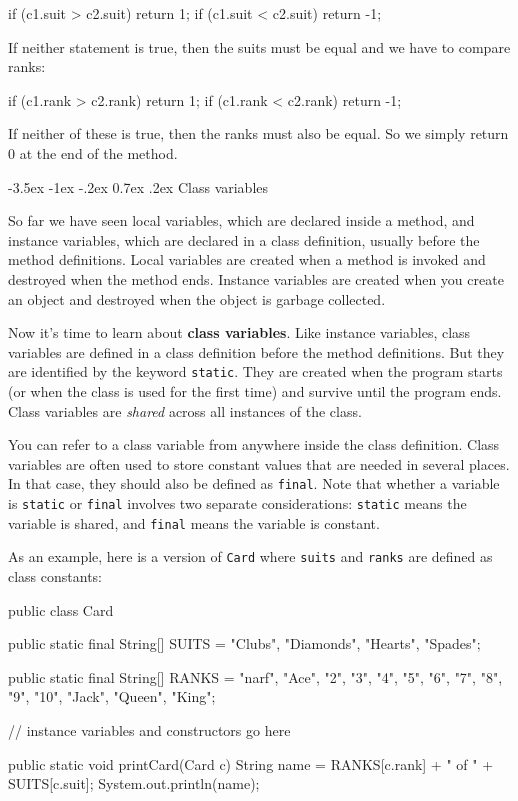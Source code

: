 \documentclass[12pt]{book}
\makeatletter
\theoremstyle{exercise}
\newcommand{\java}[1]{\verb"#1"}
\renewcommand{\section}{\@startsection {section}{1}{\z@}%
    {-3.5ex \@plus -1ex \@minus -.2ex}%
    {0.7ex \@plus.2ex}%
    {\normalfont\Large\bfseries}}
\newcommand{\java}[1]{\lstinline{#1}} %
\makeatother
\begin{document}
\begin{code}
    if (c1.suit > c2.suit) {
        return 1;
    }
    if (c1.suit < c2.suit) {
        return -1;
    }
\end{code}

If neither statement is true, then the suits must be equal and we have to compare ranks:

\begin{code}
    if (c1.rank > c2.rank) {
        return 1;
    }
    if (c1.rank < c2.rank) {
        return -1;
    }
\end{code}

If neither of these is true, then the ranks must also be equal.
So we simply return 0 at the end of the method.


\section{Class variables}

So far we have seen local variables, which are declared inside a method, and instance variables, which are declared in a class
definition, usually before the method definitions.
Local variables are created when a method is invoked and destroyed when the method ends.
Instance variables are created when you create an object and destroyed when the object is garbage collected.


Now it's time to learn about {\bf class variables}.
Like instance variables, class variables are defined in a class definition before the method definitions.
But they are identified by the keyword \java{static}.
They are created when the program starts (or when the class is used for the first time) and survive until the program ends.
Class variables are {\em shared} across all instances of the class.

You can refer to a class variable from anywhere inside the class definition.
Class variables are often used to store constant values that are needed in several places.
In that case, they should also be defined as \java{final}.
Note that whether a variable is \java{static} or \java{final} involves two separate considerations:
\java{static} means the variable is shared, and \java{final} means the variable is constant.

As an example, here is a version of \java{Card} where \java{suits} and \java{ranks} are defined as class constants:

\begin{code}
public class Card {

    public static final String[] SUITS = {
        "Clubs", "Diamonds", "Hearts", "Spades"};

    public static final String[] RANKS = {
        "narf", "Ace", "2", "3", "4", "5", "6", "7", "8", "9",
        "10", "Jack", "Queen", "King"};

    // instance variables and constructors go here

    public static void printCard(Card c) {
        String name = RANKS[c.rank] + " of " + SUITS[c.suit];
        System.out.println(name);
    }
}
\end{code}
\end{document}
